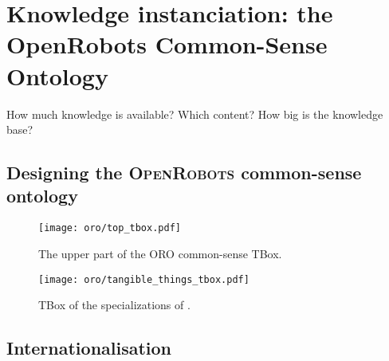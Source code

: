
\section{Knowledge instanciation: the OpenRobots Common-Sense Ontology}

How much knowledge is available? Which content? How big is the knowledge base?

\subsection{Designing the \textsc{OpenRobots} common-sense ontology}
\label{sect|commonsense-design}

\begin{figure}
    \centering
    \texttt{[image: oro/top\_tbox.pdf]}
    \caption{The upper part of the ORO common-sense TBox.}
    \label{fig|upper_tbox}
\end{figure}

\begin{figure}
    \centering
    \texttt{[image: oro/tangible\_things\_tbox.pdf]}
    \caption{TBox of the specializations of .}
    \label{fig|tangible_things_tbox}
\end{figure}

\subsection{Internationalisation}
\label{sect|commonsense-i13n}
